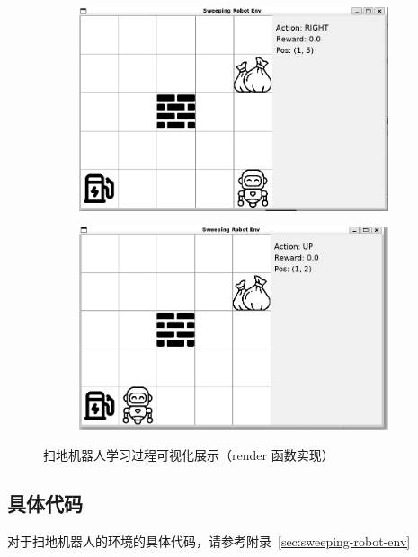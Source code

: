 \begin{figure}[htb]
\centering
\begin{subfigure}{0.48\linewidth}
    \centering
    \includegraphics[width=\linewidth]{figure/sweep_robot_env_render1.jpg}
\end{subfigure}
\hfill
\begin{subfigure}{0.48\linewidth}
    \centering
    \includegraphics[width=\linewidth]{figure/sweep_robot_env_render2.jpg}
\end{subfigure}
\caption{扫地机器人学习过程可视化展示（\textsf{render} 函数实现）}
\label{fig:sweeping-robot-env-render}
\end{figure}

\subsection{具体代码}

对于扫地机器人的环境的具体代码，请参考附录~\ref{sec:sweeping-robot-env}